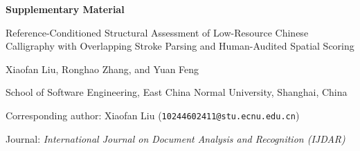 \documentclass[pdflatex,sn-basic,Numbered]{sn-jnl}
\begin{document}
\begin{center}
{\Large\bfseries Supplementary Material\par}
\vspace{0.5em}
{\large Reference-Conditioned Structural Assessment of Low-Resource Chinese
Calligraphy with Overlapping Stroke Parsing and Human-Audited Spatial
Scoring\par}
\vspace{0.5em}
Xiaofan Liu, Ronghao Zhang, and Yuan Feng\par
School of Software Engineering, East China Normal University, Shanghai,
China\par
Corresponding author: Xiaofan Liu
(\texttt{10244602411@stu.ecnu.edu.cn})\par
Journal: \textit{International Journal on Document Analysis and Recognition
(IJDAR)}
\end{center}

\setcounter{table}{0}
\renewcommand{\thetable}{S\arabic{table}}



\end{document}
